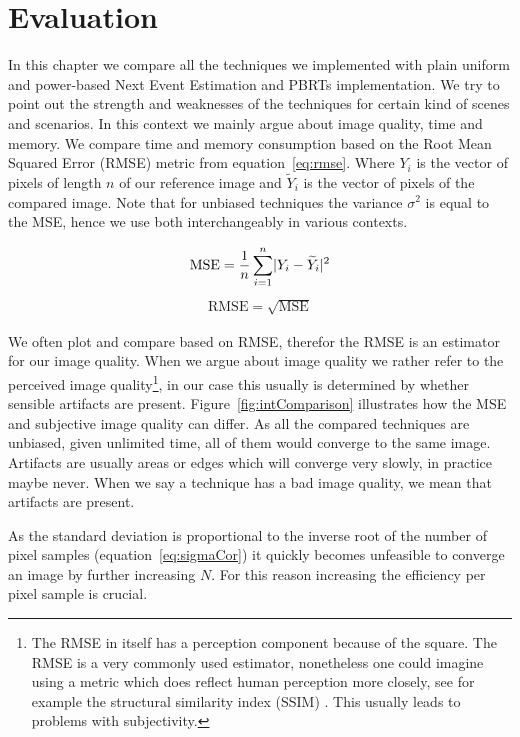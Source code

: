 \chapter{Evaluation}
\label{ch:Evaluation}
In this chapter we compare all the techniques we implemented with plain uniform and power-based Next Event Estimation and PBRTs implementation. We try to point out the strength and weaknesses of the techniques for certain kind of scenes and scenarios. In this context we mainly argue about image quality, time and memory. We compare time and memory consumption based on the Root Mean Squared Error (RMSE) metric from equation~\ref{eq:rmse}. Where $Y_i$ is the vector of pixels of length $n$ of our reference image and $\widetilde{Y}_i$ is the vector of pixels of the compared image. Note that for unbiased techniques the variance $\sigma^2$ is equal to the MSE, hence we use both interchangeably in various contexts. 

\begin{align}\label{eq:mse}
\text{MSE} = \frac{1}{n}\sum_{i=1}^{n}\lvert Y_i - \widetilde{Y}_i\rvert^2
\end{align}
\begin{align}\label{eq:rmse}
\text{RMSE} = \sqrt{\text{MSE}}
\end{align}


We often plot and compare based on RMSE, therefor the RMSE is an estimator for our image quality. When we argue about image quality we rather refer to the perceived image quality\footnote{The RMSE in itself has a perception component because of the square. The RMSE is a very commonly used estimator, nonetheless one could imagine using a metric which does reflect human perception more closely, see for example the structural similarity index (SSIM) \parencite{DBLP:journals/tip/WangBSS04}. This usually leads to problems with subjectivity.}, in our case this usually is determined by whether sensible artifacts are present. Figure~\ref{fig:intComparison} illustrates how the MSE and subjective image quality can differ. As all the compared techniques are unbiased, given unlimited time, all of them would converge to the same image. Artifacts are usually areas or edges which will converge very slowly, in practice maybe never. When we say a technique has a bad image quality, we mean that artifacts are present. 

As the standard deviation is proportional to the inverse root of the number of pixel samples (equation~\ref{eq:sigmaCor}) it quickly becomes unfeasible to converge an image by further increasing $N$. For this reason increasing the efficiency per pixel sample is crucial.

